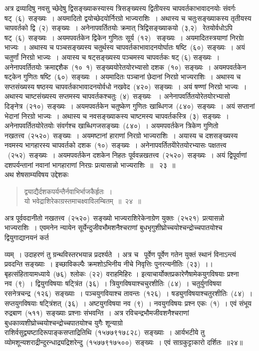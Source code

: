 \documentclass[11pt, openany]{book}
\begin{document}
\indent
अत्र द्रव्यादिषु नवसु च्छेदेषु द्विसङ्ख्याकस्यास्य त्रिसङ्ख्यस्य द्वितीयस्य चापवर्तकाभावादनयोः संवर्गः षट्~(६)~सङ्ख्यः~। अयमादितो द्वयोच्छेदयोर्निरग्रो भाज्यराशिः~। अथास्य च चतुःसङ्ख्याकस्य तृतीयस्य चापवर्तको द्वि~(२)~सङ्ख्यः~। अनेनापवर्तितयोः क्रमात् त्रिद्विसङ्ख्याकयो~(३,२)~ रेतयोर्वधोऽपि षट्~(६)~सङ्ख्यः~। अयमपवर्तकेन द्विकेन गुणितः सूर्य~(१२)~ सङ्ख्यः~। अयमादितस्त्रयाणां निरग्राे भाज्यः~। अथास्य च पञ्चसङ्ख्यस्य चतुर्थस्य चापवर्तकाभावादनयोर्घातः षष्टि~(६०)~सङ्ख्यः~। अयं चतुर्णां निरग्रो भाज्यः~। अयास्य च षट्सङ्ख्यस्य पञ्चमस्य चापवर्तकः षट् (६) सङ्ख्यः~। अनेनापवर्तितयोः क्रमाद्दशैक~(१०\textendash\ १)~सङ्ख्ययोरेतयोरभ्यासो दशक~(१०)~सङ्ख्यः~। अयमपवर्तकेन षट्केन गुणितः षष्टि~(६०)~सङ्ख्यः~। अयमादितः पञ्चानां छेदानां निरग्रो भाज्यराशिः~। अथास्य च सप्तसंख्यस्य षष्ठस्य चापवर्तकाभावादनयोर्वधो नखवेद~(४२०)~सङ्ख्यः~। अयं षण्णां निरग्रो भाज्यः~। अथास्य चाष्टसंख्यस्य सप्तमस्य चापवर्तकश्चतुः~(४)~सङ्ख्यः ~। अनेनापवर्तितयोरेतयोरभ्यासो दिङ्नेत्र~(२१०)~सङ्ख्यः~। अयमपवर्तकेन चतुष्केण गुणितः खाब्धिगज~(८४०)~सङ्ख्यः~। अयं सप्तानां भेदानां निरग्रो भाज्यः~। अथास्य च नवसङ्ख्याकस्य चाष्टमस्य चापवर्तकस्त्रि~(३)~सङ्ख्यः~। अनेनापवर्तितयोरेतयोः संवर्गश्च खाब्धिगजसङ्ख्यः~(८४०)~। अयमपवर्तकेन त्रिकेण गुणितो नखतत्त्व~(२५२०)~सङ्ख्यः~। अयमष्टानां हाराणां निरग्रो भाज्यराशिः~। अयास्य च दशसङ्ख्यस्य नवमस्य भागहारस्य चापवर्तको दशक~(१०)~सङ्ख्यः~। अनेनापवर्तितयोेरेतयोरभ्यासः पक्षतत्त्व ~(२५२)~सङ्ख्यः~। अयमपवर्तकेन दशकेन निहतः पूर्ववन्नखतत्त्व~(२५२०)~सङ्ख्यः~। अयं द्विपूर्वाणां दशपर्यन्तानां नवानां भागहाराणां निरग्रः प्रत्यासान्नो भाज्यराशिः~॥~ २३~॥\\

\indent
अथ शेषसाम्यविषय उद्देशकः \textendash
\begin{quote}
{\ku द्व्याद्यैर्दशकपर्यन्तैर्नवाभिर्भाजकैर्हृतः~।\\
यो भवेद्राशिरेकाग्रस्तमाचक्ष्वाविलम्बितम्~॥~२४~॥~}
\end{quote}

\indent
अत्र पूर्ववदानीतो नखतत्त्व~(२५२०)~सङ्ख्यो भाज्यराशिरेकेनाग्रेण युक्तः~(२५२१)~प्रत्यासन्नो भाज्यराशिः~। एवमनेन न्यायेन सूर्येन्दुजीवभौमशनैश्चराणां बुधभृगुशीघ्रोच्चयोश्चन्द्रोच्चपातयोश्च द्वियुगाद्यानयनं कर्त \textendash 

\newpage
\thispagestyle{fancy}
\fancyhf{}

\noindent
व्यम्~। उदाहरणं तु ग्रन्थविस्तरभयान्न प्रदर्श्यते~। अत्र च \textendash\ पूर्वेण पूर्वेण गतेन युक्तं स्थानं विनाऽन्त्यं प्रवदन्ति सङ्ख्याः~। इच्छाविकल्पैः क्रमशोऽभिनीय नीचे निवृत्तिः पुनरन्यनीतिः~(२३)~।। बृहत्संहितायामध्याये~(७६)~श्लोकः~(२२)~वराहमिहिरः । इत्याचार्योक्तप्रकारेणैषामेकयुगविषयाः प्रश्ना नव~(९)~। द्वियुगविषयाः षट्त्रिंत~(३६)~। त्रियुगविषयाश्चचुरशीतिः~(८४)~। चतुर्युगविषया रसनेत्रचन्द्र~(१२६)~सङ्ख्याः~। पञ्चयुगवियाश्च तावन्तः~(१२६)~। षड्युगविषयाश्चतुरशीतिः~(८४)~। सप्तयुगविषयाः षट्त्रिंशत्~(३६)~। अष्टयुगविषया नव~(९)~। नवयुगविषयः प्रश्न एकः~(१)~। एवं संभूय रुद्रबाण~(५११)~सङ्ख्याः प्रश्नाः संभवन्ति~। अत्र रविचन्द्रभौमजीवशनैश्चराणां बुधकाव्यशीघ्रोच्चयोश्चन्द्रोच्चपातयोश्च युगैः शून्याग्रो राशिर्वसुद्व्यष्टादिरूपाङ्कसप्ताद्रितिथि~(१५७७९१७८२८)~सङ्ख्याः~। आर्यभटीये तु व्योमशून्यशराद्रीन्दुरन्धाद्र्यद्रिशरेन्दु~(१५७७९१७५००)~सङ्ख्यः~। एवं साग्रकुट्टाकारो दर्शितः~॥२४॥\\
\end{document}
